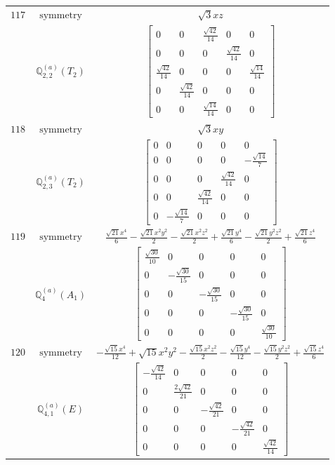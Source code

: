 \documentclass[fleqn,8pt,landscape]{jsarticle}
\begin{document}
\begin{longtable}{ccc}
$ 117 $ & $ \text{symmetry} $ & $ \sqrt{3} x z $ \\
$  $ & $ \mathbb{Q}_{2,2}^{(a)}(T_{2}) $ & $ \begin{bmatrix} 0 & 0 & \frac{\sqrt{42}}{14} & 0 & 0 \\ 0 & 0 & 0 & \frac{\sqrt{42}}{14} & 0 \\ \frac{\sqrt{42}}{14} & 0 & 0 & 0 & \frac{\sqrt{14}}{14} \\ 0 & \frac{\sqrt{42}}{14} & 0 & 0 & 0 \\ 0 & 0 & \frac{\sqrt{14}}{14} & 0 & 0 \end{bmatrix} $ \\ \hline
$ 118 $ & $ \text{symmetry} $ & $ \sqrt{3} x y $ \\
$  $ & $ \mathbb{Q}_{2,3}^{(a)}(T_{2}) $ & $ \begin{bmatrix} 0 & 0 & 0 & 0 & 0 \\ 0 & 0 & 0 & 0 & - \frac{\sqrt{14}}{7} \\ 0 & 0 & 0 & \frac{\sqrt{42}}{14} & 0 \\ 0 & 0 & \frac{\sqrt{42}}{14} & 0 & 0 \\ 0 & - \frac{\sqrt{14}}{7} & 0 & 0 & 0 \end{bmatrix} $ \\ \hline
$ 119 $ & $ \text{symmetry} $ & $ \frac{\sqrt{21} x^{4}}{6} - \frac{\sqrt{21} x^{2} y^{2}}{2} - \frac{\sqrt{21} x^{2} z^{2}}{2} + \frac{\sqrt{21} y^{4}}{6} - \frac{\sqrt{21} y^{2} z^{2}}{2} + \frac{\sqrt{21} z^{4}}{6} $ \\
$  $ & $ \mathbb{Q}_{4}^{(a)}(A_{1}) $ & $ \begin{bmatrix} \frac{\sqrt{30}}{10} & 0 & 0 & 0 & 0 \\ 0 & - \frac{\sqrt{30}}{15} & 0 & 0 & 0 \\ 0 & 0 & - \frac{\sqrt{30}}{15} & 0 & 0 \\ 0 & 0 & 0 & - \frac{\sqrt{30}}{15} & 0 \\ 0 & 0 & 0 & 0 & \frac{\sqrt{30}}{10} \end{bmatrix} $ \\ \hline
$ 120 $ & $ \text{symmetry} $ & $ - \frac{\sqrt{15} x^{4}}{12} + \sqrt{15} x^{2} y^{2} - \frac{\sqrt{15} x^{2} z^{2}}{2} - \frac{\sqrt{15} y^{4}}{12} - \frac{\sqrt{15} y^{2} z^{2}}{2} + \frac{\sqrt{15} z^{4}}{6} $ \\
$  $ & $ \mathbb{Q}_{4,1}^{(a)}(E) $ & $ \begin{bmatrix} - \frac{\sqrt{42}}{14} & 0 & 0 & 0 & 0 \\ 0 & \frac{2 \sqrt{42}}{21} & 0 & 0 & 0 \\ 0 & 0 & - \frac{\sqrt{42}}{21} & 0 & 0 \\ 0 & 0 & 0 & - \frac{\sqrt{42}}{21} & 0 \\ 0 & 0 & 0 & 0 & \frac{\sqrt{42}}{14} \end{bmatrix} $ \\ \hline

\end{longtable}
\end{document}
